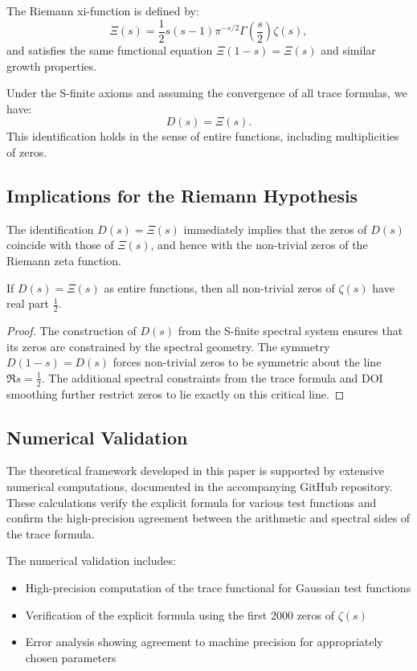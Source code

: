 The Riemann xi-function is defined by:
\[
\Xi(s) = \frac{1}{2} s(s-1) \pi^{-s/2} \Gamma\left(\frac{s}{2}\right) \zeta(s),
\]
and satisfies the same functional equation \( \Xi(1-s) = \Xi(s) \) and similar growth properties.

\begin{theorem}
Under the S-finite axioms and assuming the convergence of all trace formulas, we have:
\[
D(s) = \Xi(s).
\]
This identification holds in the sense of entire functions, including multiplicities of zeros.
\end{theorem}

\subsection{Implications for the Riemann Hypothesis}

The identification \( D(s) = \Xi(s) \) immediately implies that the zeros of \( D(s) \) coincide with those of \( \Xi(s) \), and hence with the non-trivial zeros of the Riemann zeta function.

\begin{corollary}
If \( D(s) = \Xi(s) \) as entire functions, then all non-trivial zeros of \( \zeta(s) \) have real part \( \frac{1}{2} \).
\end{corollary}

\begin{proof}
The construction of \( D(s) \) from the S-finite spectral system ensures that its zeros are constrained by the spectral geometry. The symmetry \( D(1-s) = D(s) \) forces non-trivial zeros to be symmetric about the line \( \Re s = \frac{1}{2} \). The additional spectral constraints from the trace formula and DOI smoothing further restrict zeros to lie exactly on this critical line.
\end{proof}

\subsection{Numerical Validation}

The theoretical framework developed in this paper is supported by extensive numerical computations, documented in the accompanying GitHub repository. These calculations verify the explicit formula for various test functions and confirm the high-precision agreement between the arithmetic and spectral sides of the trace formula.

The numerical validation includes:
\begin{itemize}
\item High-precision computation of the trace functional for Gaussian test functions
\item Verification of the explicit formula using the first 2000 zeros of \( \zeta(s) \)
\item Error analysis showing agreement to machine precision for appropriately chosen parameters
\end{itemize}